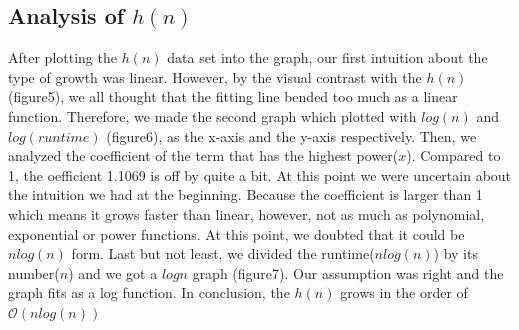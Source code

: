 \documentclass[titlepage, 12pt]{article}
\begin{document}
\subsection{Analysis of $h(n)$}
After plotting the $h(n)$ data set into the graph, our first intuition about the 
type of growth was linear. However, by the visual contrast with the $h(n)$ (figure5), 
we all thought that the fitting line bended too much as a linear function. 
Therefore, we made the second graph which plotted with $log(n)$ and $log(runtime)$ 
(figure6), as the x-axis and the y-axis respectively. Then, we analyzed the 
coefficient of the term that has the highest power($x$). Compared to 1, the 
oefficient 1.1069 is off by quite a bit. At this point we were uncertain about 
the intuition we had at the beginning. Because the coefficient is larger than 1 
which means it grows faster than linear, however, not as much as polynomial, 
exponential or power functions. At this point, we doubted that it could be $nlog(n)$ 
form. Last but not least, we divided the runtime($nlog(n)$) by its number($n$) and we 
got a $logn$ graph (figure7). Our assumption was right and the graph fits as a log function. 
In conclusion, the $h(n)$ grows in the order of $\mathcal{O}(nlog(n))$
\end{document}
